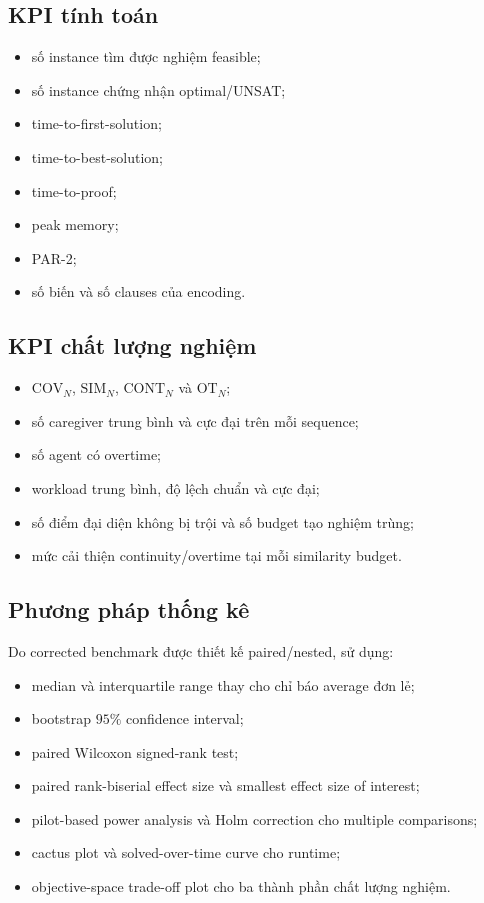 \documentclass[12pt,a4paper]{article}
\newcommand{\SIM}{\mathrm{SIM}}
\newcommand{\CONT}{\mathrm{CONT}}
\newcommand{\OT}{\mathrm{OT}}
\newcommand{\COV}{\mathrm{COV}}
\begin{document}
\subsection{KPI tính toán}

\begin{itemize}
  \item số instance tìm được nghiệm feasible;
  \item số instance chứng nhận optimal/UNSAT;
  \item time-to-first-solution;
  \item time-to-best-solution;
  \item time-to-proof;
  \item peak memory;
  \item PAR-2;
  \item số biến và số clauses của encoding.
\end{itemize}

\subsection{KPI chất lượng nghiệm}

\begin{itemize}
  \item $\COV_N$, $\SIM_N$, $\CONT_N$ và $\OT_N$;
  \item số caregiver trung bình và cực đại trên mỗi sequence;
  \item số agent có overtime;
  \item workload trung bình, độ lệch chuẩn và cực đại;
  \item số điểm đại diện không bị trội và số budget tạo nghiệm trùng;
  \item mức cải thiện continuity/overtime tại mỗi similarity budget.
\end{itemize}

\subsection{Phương pháp thống kê}

Do corrected benchmark được thiết kế paired/nested, sử dụng:
\begin{itemize}
  \item median và interquartile range thay cho chỉ báo average đơn lẻ;
  \item bootstrap $95\%$ confidence interval;
  \item paired Wilcoxon signed-rank test;
  \item paired rank-biserial effect size và smallest effect size of interest;
  \item pilot-based power analysis và Holm correction cho multiple comparisons;
  \item cactus plot và solved-over-time curve cho runtime;
  \item objective-space trade-off plot cho ba thành phần chất lượng nghiệm.
\end{itemize}
\end{document}
